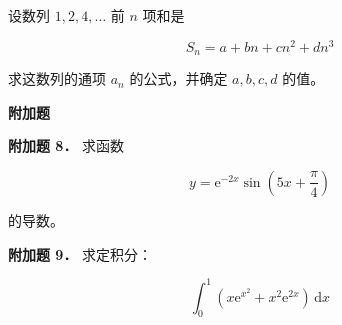 \begin{question}
设数列 $1,2,4,\ldots$ 前 $n$ 项和是

\nopagebreak[4]
\[
S_n=a+bn+cn^2+dn^3
\]

求这数列的通项 $a_n$ 的公式，并确定 $a,b,c,d$ 的值。

\begin{gktip}
\Needspace{0.25\textheight}
\textbf{附加题}
\end{gktip}

\textbf{附加题 8．} 求函数

\nopagebreak[4]
\[
y=\mathrm e^{-2x}\sin\left(5x+\frac\pi4\right)
\]

的导数。

\textbf{附加题 9．} 求定积分：

\nopagebreak[4]
\[
\int_0^1\left(x\mathrm e^{x^2}+x^2\mathrm e^{2x}\right)\,\mathrm dx
\]

\end{question}